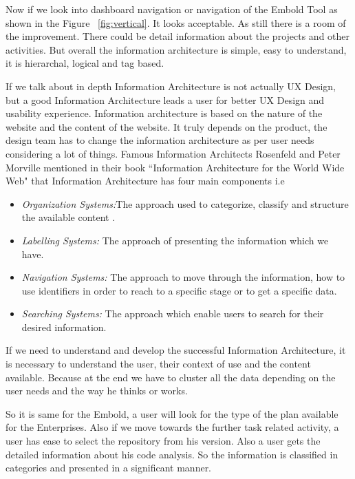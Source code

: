\indent Now if we look into dashboard navigation or navigation of the Embold Tool as shown in the Figure ~\ref{fig:vertical}.  It looks acceptable. As still there is a room of the improvement. There could be detail information about the projects and other activities. But overall the information architecture is simple, easy to understand, it is hierarchal, logical and tag based. \par
If we talk about in depth Information Architecture is not actually UX Design, but a good Information Architecture leads a user for better UX Design and usability experience. Information architecture is based on the nature of the website and the content of the website. It truly depends on the product, the design team has to change the information architecture as per user needs considering a lot of things. Famous Information Architects Rosenfeld and Peter Morville mentioned in their book ``Information Architecture for the World Wide Web" that Information Architecture has four main components i.e 
\begin{itemize}
\item\emph{Organization Systems:}The approach used to categorize, classify and structure the available content .
\item\emph{Labelling Systems:} The approach of presenting the information which we have. 
\item\emph{Navigation Systems:}  The approach to move through the information, how to use identifiers in order to reach to a specific stage or to get a specific data.
\item\emph{Searching Systems:} The approach which enable users to search for their desired information. 
\end{itemize} 
If we need to understand and develop the successful Information Architecture, it is necessary to understand the user, their context of use and the content available. Because at the end we have to cluster all the data depending on the user needs and the way he thinks or works. ~\cite{IA} \par
So it is same for the  Embold, a user will look for the type of the plan available for the Enterprises. Also if we move towards the further task related activity, a user has ease to select the repository from his version. Also a user gets the detailed information about his code analysis. So the information is classified in categories and presented in a significant manner.
